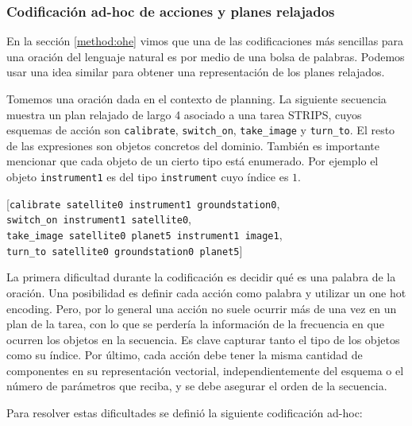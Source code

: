 \subsubsection{Codificación ad-hoc de acciones y planes relajados}
\label{method:vectorization}

En la sección \ref{method:ohe} vimos que una de las codificaciones más sencillas
para una oración del lenguaje natural es por medio de una bolsa de palabras.
Podemos usar una idea similar para obtener una representación de los
planes relajados.

Tomemos una oración dada en el contexto de planning. La siguiente secuencia
muestra un plan relajado de largo 4 asociado a una tarea STRIPS, cuyos esquemas
de acción son \verb|calibrate|, \verb|switch_on|, \verb|take_image| y
\verb|turn_to|. El resto de las expresiones son objetos concretos del dominio.
También es importante mencionar que cada objeto de un cierto tipo está
enumerado. Por ejemplo el objeto \verb|instrument1| es del tipo
\verb|instrument| cuyo índice es $1$.

\begin{center}
    [\verb|calibrate satellite0 instrument1 groundstation0|, \\
    \verb|switch_on instrument1 satellite0|, \\
    \verb|take_image satellite0 planet5 instrument1 image1|, \\
    \verb|turn_to satellite0 groundstation0 planet5|] \\
\end{center}

La primera dificultad durante la codificación es decidir qué es una palabra de
la oración. Una posibilidad es definir cada acción como palabra y utilizar un
one hot encoding. Pero, por lo general una acción no suele ocurrir más de una
vez en un plan de la tarea, con lo que se perdería la información de la
frecuencia en que ocurren los objetos en la secuencia. Es clave capturar tanto
el tipo de los objetos como su índice. Por último, cada acción debe tener la
misma cantidad de componentes en su representación vectorial, independientemente
del esquema o el número de parámetros que reciba, y se debe asegurar el orden de
la secuencia.

Para resolver estas dificultades se definió la siguiente codificación ad-hoc:

